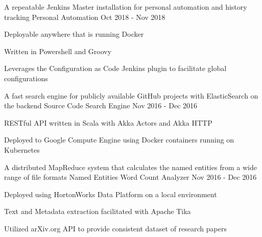 
\begin{cventries}

  \cventry
    {A repeatable Jenkins Master installation for personal automation and history tracking} %
    {Personal Automation} %
    {} %
    {Oct 2018 - Nov 2018} %
    {
      \begin{cvitems} %
        \item {Deployable anywhere that is running Docker}
        \item {Written in Powershell and Groovy}
        \item {Leverages the Configuration as Code Jenkins plugin to facilitate global configurations}
      \end{cvitems}
    }

  \cventry
    {A fast search engine for publicly available GitHub projects with ElasticSearch on the backend} %
    {Source Code Search Engine} %
    {} %
    {Nov 2016 - Dec 2016} %
    {
      \begin{cvitems} %
        \item {RESTful API written in Scala with Akka Actors and Akka HTTP}
        \item {Deployed to Google Compute Engine using Docker containers running on Kubernetes}
      \end{cvitems}
    }

  \cventry
    {A distributed MapReduce system that calculates the named entities from a wide range of file formats} %
    {Named Entities Word Count Analyzer} %
    {} %
    {Nov 2016 - Dec 2016} %
    {
      \begin{cvitems} %
        \item {Deployed using HortonWorks Data Platform on a local environment}
        \item {Text and Metadata extraction facilitated with Apache Tika}
        \item {Utilized arXiv.org API to provide consistent dataset of research papers}
      \end{cvitems}
    }


\end{cventries}
